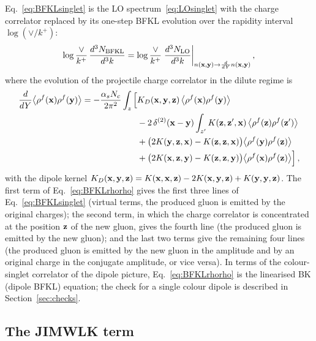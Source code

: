 Eq.~\eqref{eq:BFKLsinglet} is the LO spectrum~\eqref{eq:LOsinglet} with the charge correlator replaced by its one-step BFKL evolution over the rapidity interval $\log(\vee/k^+)$:
\begin{align}\label{eq:BFKLasLO}
\log\frac{\vee}{k^+}\,\frac{d^3N_{\rm BFKL}}{d^3k}=\log\frac{\vee}{k^+}\;\frac{d^3N_{\rm LO}}{d^3k}\bigg|_{n(\mathbf{x},\mathbf{y})\to\frac{d}{dY}n(\mathbf{x},\mathbf{y})}\,,
\end{align}
where the evolution of the projectile charge correlator in the dilute regime is~\cite{Kovner:2006wr,Kovner:2006ge}
\begin{align}\label{eq:BFKLrhorho}
\frac{d}{dY}\big\langle\rho^f(\mathbf{x})\rho^f(\mathbf{y})\big\rangle=-\frac{\alpha_sN_c}{2\pi^2}\int_z\Big[&K_D(\mathbf{x},\mathbf{y},\mathbf{z})\,\big\langle\rho^f(\mathbf{x})\rho^f(\mathbf{y})\big\rangle
\notag\\&-2\,\delta^{(2)}(\mathbf{x}-\mathbf{y})\int_{z'}K(\mathbf{z},\mathbf{z}',\mathbf{x})\,\big\langle\rho^f(\mathbf{z})\rho^f(\mathbf{z}')\big\rangle
\notag\\&
+\big(2K(\mathbf{y},\mathbf{z},\mathbf{x})-K(\mathbf{z},\mathbf{z},\mathbf{x})\big)\big\langle\rho^f(\mathbf{y})\rho^f(\mathbf{z})\big\rangle
\notag\\&+\big(2K(\mathbf{x},\mathbf{z},\mathbf{y})-K(\mathbf{z},\mathbf{z},\mathbf{y})\big)\big\langle\rho^f(\mathbf{x})\rho^f(\mathbf{z})\big\rangle\Big]\,,
\end{align}
with the dipole kernel $K_D(\mathbf{x},\mathbf{y},\mathbf{z})=K(\mathbf{x},\mathbf{x},\mathbf{z})-2K(\mathbf{x},\mathbf{y},\mathbf{z})+K(\mathbf{y},\mathbf{y},\mathbf{z})$. The first term of Eq.~\eqref{eq:BFKLrhorho} gives the first three lines of Eq.~\eqref{eq:BFKLsinglet} (virtual terms, the produced gluon is emitted by the original charges); the second term, in which the charge correlator is concentrated at the position $\mathbf{z}$ of the new gluon, gives the fourth line (the produced gluon is emitted by the new gluon); and the last two terms give the remaining four lines (the produced gluon is emitted by the new gluon in the amplitude and by an original charge in the conjugate amplitude, or vice versa). In terms of the colour-singlet correlator of the dipole picture, Eq.~\eqref{eq:BFKLrhorho} is the linearised BK (dipole BFKL) equation; the check for a single colour dipole is described in Section~\ref{sec:checks}.

\subsection{The JIMWLK term}\label{sec:JIMWLK}

